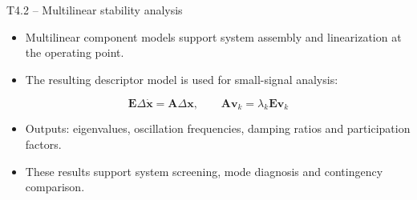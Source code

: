 \documentclass[aspectratio=1609,9pt]{beamer}
\begin{document}
\begin{frame}[t]{T4.2 -- Multilinear stability analysis}
  \vspace{1ex}
  \begin{itemize}\setlength{\itemsep}{1.5ex}
    \item Multilinear component models support system assembly and linearization at the operating point.
    \item The resulting descriptor model is used for small-signal analysis:
  \end{itemize}
  \vspace{0.5ex}
  \[
    \mathbf{E}\Delta\dot{\mathbf{x}}=\mathbf{A}\Delta \mathbf{x},
    \qquad \mathbf{A} \mathbf{v}_k=\lambda_k \mathbf{E} \mathbf{v}_k
  \]
  \vspace{0.5ex}
  \begin{itemize}\setlength{\itemsep}{1.5ex}
    \item Outputs: eigenvalues, oscillation frequencies, damping ratios and participation factors.
    \item These results support system screening, mode diagnosis and contingency comparison.
  \end{itemize}
\end{frame}
\end{document}
